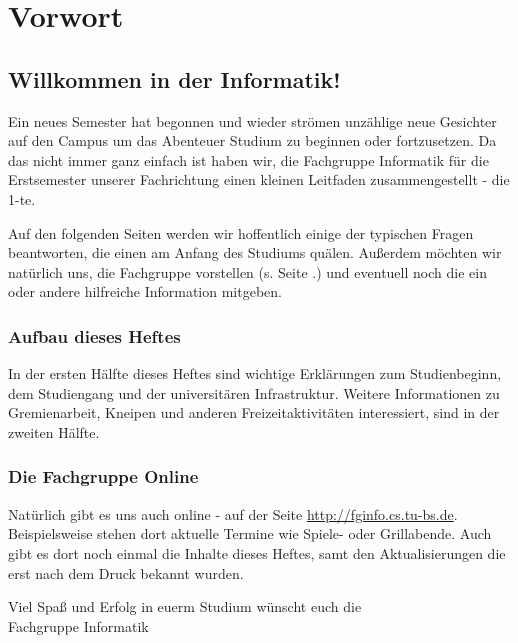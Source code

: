 
\section{Vorwort}
\label{vorwort}
	\begin{multicols}{2}
	\subsection*{Willkommen in der Informatik!}	

	Ein neues Semester hat begonnen und wieder strömen unzählige neue Gesichter auf den Campus um das Abenteuer Studium zu beginnen oder fortzusetzen. Da das nicht immer ganz einfach ist haben wir, die Fachgruppe Informatik für die Erstsemester unserer Fachrichtung einen kleinen Leitfaden zusammengestellt - die 1-te.

	Auf den folgenden Seiten werden wir hoffentlich einige der typischen Fragen beantworten, die einen am Anfang des Studiums quälen. Außerdem möchten wir natürlich uns, die Fachgruppe vorstellen (s. Seite .\pageref{fachgruppe}) und eventuell noch die ein oder andere hilfreiche Information mitgeben. 

	\subsubsection*{Aufbau dieses Heftes}
		In der ersten Hälfte dieses Heftes sind wichtige Erklärungen zum Studienbeginn, dem Studiengang und der universitären Infrastruktur. Weitere Informationen zu Gremienarbeit, Kneipen und anderen Freizeitaktivitäten interessiert, sind in der zweiten Hälfte.

	\subsubsection*{Die Fachgruppe Online}
		Natürlich gibt es uns auch online - auf der Seite \url{http://fginfo.cs.tu-bs.de}. Beispielsweise stehen dort aktuelle Termine wie Spiele- oder Grillabende. Auch gibt es dort noch einmal die Inhalte dieses Heftes, samt den Aktualisierungen die erst nach dem Druck bekannt wurden. 

	\vspace*{0.5cm}

	Viel Spaß und Erfolg in euerm Studium wünscht euch die\\
	\hspace*{2cm}Fachgruppe Informatik
	\end{multicols}